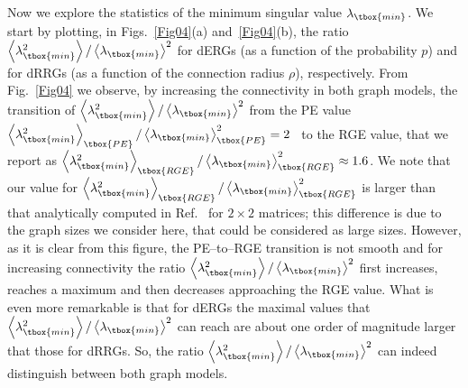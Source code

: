 Now we explore the statistics of the minimum singular value $\lambda_{\tbox{min}}$.
We start by plotting, in Figs.~\ref{Fig04}(a) and~\ref{Fig04}(b), the ratio
$\left\langle \lambda_{\tbox{min}}^2 \right\rangle/\left\langle \lambda_{\tbox{min}} \right\rangle^2$ 
for dERGs (as a function of the probability $p$) and for dRRGs (as a function of the connection radius 
$\rho$), respectively. 
From Fig.~\ref{Fig04} we observe, by increasing the connectivity in both graph models, the transition of  
$\left\langle \lambda_{\tbox{min}}^2 \right\rangle/\left\langle \lambda_{\tbox{min}} \right\rangle^2$ 
from the PE value 
$\left\langle \lambda_{\tbox{min}}^2 \right\rangle_{\tbox{PE}}/\left\langle \lambda_{\tbox{min}} \right\rangle_{\tbox{PE}}^2=2$~\cite{KXOS23} to the RGE value, that we report as
$\left\langle \lambda_{\tbox{min}}^2 \right\rangle_{\tbox{RGE}}/\left\langle \lambda_{\tbox{min}} \right\rangle_{\tbox{RGE}}^2\approx 1.6$. We note that our value for $\left\langle \lambda_{\tbox{min}}^2 \right\rangle_{\tbox{RGE}}/\left\langle \lambda_{\tbox{min}} \right\rangle_{\tbox{RGE}}^2$ is larger than that analytically computed in Ref.~\cite{KXOS23}
for $2\times 2$ matrices; this difference is due to the graph sizes we consider here, that could be considered
as large sizes.
However, as it is clear from this figure, the PE--to--RGE transition is not smooth and for increasing connectivity
the ratio $\left\langle \lambda_{\tbox{min}}^2 \right\rangle/\left\langle \lambda_{\tbox{min}} \right\rangle^2$
first increases, reaches a maximum and then decreases approaching the RGE value.
What is even more remarkable is that for dERGs the maximal values that 
$\left\langle \lambda_{\tbox{min}}^2 \right\rangle/\left\langle \lambda_{\tbox{min}} \right\rangle^2$
can reach are about one order of magnitude larger that those for dRRGs. So, the ratio
$\left\langle \lambda_{\tbox{min}}^2 \right\rangle/\left\langle \lambda_{\tbox{min}} \right\rangle^2$
can indeed distinguish between both graph models.

